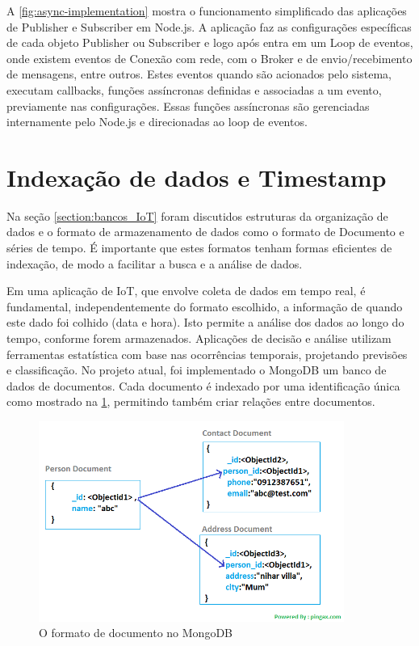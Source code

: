 A \ref{fig:async-implementation} mostra o funcionamento simplificado das aplicações de Publisher e Subscriber em Node.js. A aplicação faz as configurações específicas de cada objeto Publisher ou Subscriber e logo após entra em um Loop de eventos, onde existem eventos de Conexão com rede, com o Broker e de envio/recebimento de mensagens, entre outros. Estes eventos quando são acionados pelo sistema, executam callbacks, funções assíncronas definidas e associadas a um evento, previamente nas configurações. Essas funções assíncronas são gerenciadas internamente pelo Node.js e direcionadas ao loop de eventos.

\section{Indexação de dados e Timestamp}
\label{section:timestamp}

Na seção \ref{section:bancos_IoT} foram discutidos estruturas da organização de dados e o formato de armazenamento de dados como o formato de Documento e séries de tempo. É importante que estes formatos tenham formas eficientes de indexação, de modo a facilitar a busca e a análise de dados.

Em uma aplicação de IoT, que envolve coleta de dados em tempo real, é fundamental, independentemente do formato escolhido, a informação de quando este dado foi colhido (data e hora). Isto permite a análise dos dados ao longo do tempo, conforme forem armazenados. Aplicações de decisão e análise utilizam ferramentas estatística com base nas ocorrências temporais, projetando previsões e classificação. No projeto atual, foi implementado o MongoDB um banco de dados de documentos. Cada documento é indexado por uma identificação única como mostrado na \ref{fig:document-model}, permitindo também criar relações entre documentos.

\begin{figure}[h!]
\centering
\includegraphics[width=10cm]{./02_Capitulos/02_Cap3/figures/document-model}
\caption{O formato de documento no MongoDB}
\label{fig:document-model}
\end{figure}


